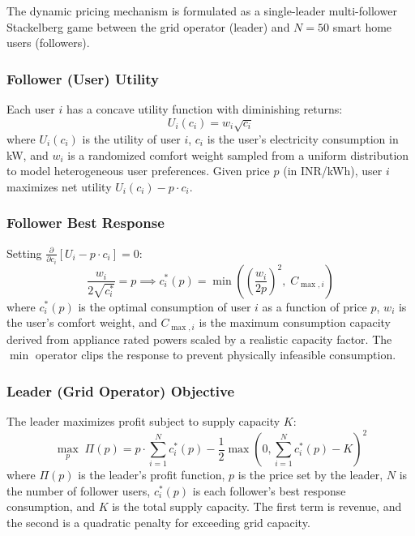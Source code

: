 \documentclass[journal]{IEEEtran}
\begin{document}
The dynamic pricing mechanism is formulated as a single-leader multi-follower Stackelberg game between the grid operator (leader) and $N = 50$ smart home users (followers).

\subsubsection{Follower (User) Utility} Each user $i$ has a concave utility function with diminishing returns:
\begin{equation}
    U_i(c_i) = w_i \sqrt{c_i}
    \label{eq:user_utility}
\end{equation}
where $U_i(c_i)$ is the utility of user $i$, $c_i$ is the user's electricity consumption in kW, and $w_i$ is a randomized comfort weight sampled from a uniform distribution to model heterogeneous user preferences. Given price $p$ (in INR/kWh), user $i$ maximizes net utility $U_i(c_i) - p \cdot c_i$.

\subsubsection{Follower Best Response} Setting $\frac{\partial}{\partial c_i}[U_i - p \cdot c_i] = 0$:
\begin{equation}
    \frac{w_i}{2\sqrt{c_i^*}} = p \implies c_i^*(p) = \min\left(\left(\frac{w_i}{2p}\right)^2, \; C_{\max,i}\right)
    \label{eq:best_response}
\end{equation}
where $c_i^*(p)$ is the optimal consumption of user $i$ as a function of price $p$, $w_i$ is the user's comfort weight, and $C_{\max,i}$ is the maximum consumption capacity derived from appliance rated powers scaled by a realistic capacity factor. The $\min$ operator clips the response to prevent physically infeasible consumption.

\subsubsection{Leader (Grid Operator) Objective} The leader maximizes profit subject to supply capacity $K$:
\begin{equation}
    \max_p \; \Pi(p) = p \cdot \sum_{i=1}^{N} c_i^*(p) - \frac{1}{2}\max\left(0, \sum_{i=1}^{N}c_i^*(p) - K\right)^2
    \label{eq:leader_obj}
\end{equation}
where $\Pi(p)$ is the leader's profit function, $p$ is the price set by the leader, $N$ is the number of follower users, $c_i^*(p)$ is each follower's best response consumption, and $K$ is the total supply capacity. The first term is revenue, and the second is a quadratic penalty for exceeding grid capacity.
\end{document}
